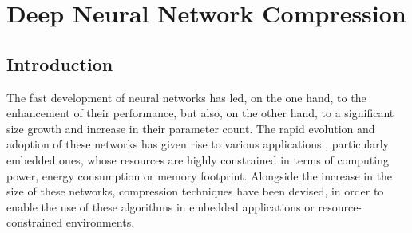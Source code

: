 \chapter{Deep Neural Network Compression}\label{chap:sota}

\localtableofcontents

\section{Introduction}\label{sec:sota:intro}

The fast development of neural networks has led, on the one hand, to the
enhancement of their performance, but also, on the other hand, to a significant
size growth and increase in their parameter count. The rapid evolution and
adoption of these networks has given rise to various applications
\cite{DBLP:conf/nips/KrizhevskySH12,DBLP:conf/emnlp/BudzianowskiV19,silver2018general,jumper2021highly},
particularly embedded ones\cite{kim2020review,kuutti2020survey}, whose resources
are highly constrained in terms of computing power, energy consumption or memory
footprint. Alongside the increase in the size of these networks, compression
techniques
\cite{DBLP:conf/nips/CunDS89,DBLP:journals/corr/HanMD15,DBLP:conf/nips/HanPTD15}
have been devised, in order to enable the use of these algorithms in embedded
applications or resource-constrained environments.\\

